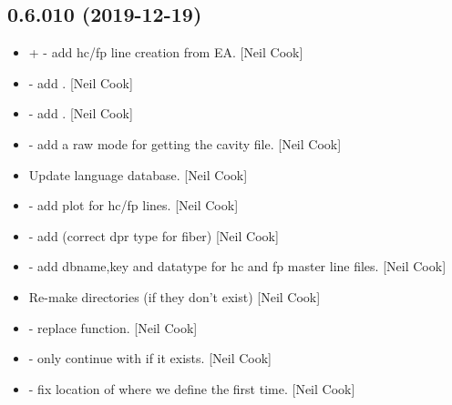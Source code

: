 \documentclass[a4paper,10pt,english]{report}
\begin{document}
\subsection{0.6.010 (2019-12-19)}
\label{\detokenize{misc/changelog:id8}}\begin{itemize}
\item {} 
 +  - add
hc/fp line creation from EA. {[}Neil Cook{]}

\item {} 
 - add .
{[}Neil Cook{]}

\item {} 
 - add . {[}Neil Cook{]}

\item {} 
 - add a raw mode for getting the cavity file. {[}Neil
Cook{]}

\item {} 
Update language database. {[}Neil Cook{]}

\item {} 
 - add plot  for hc/fp
lines. {[}Neil Cook{]}

\item {} 
 - add  (correct dpr
type for fiber) {[}Neil Cook{]}

\item {} 
 - add dbname,key and
datatype for hc and fp master line files. {[}Neil Cook{]}

\item {} 
Re-make directories (if they don’t exist) {[}Neil Cook{]}

\item {} 
 - replace  function. {[}Neil Cook{]}

\item {} 
 - only continue with  if it
exists. {[}Neil Cook{]}

\item {} 
 - fix location of where we define
 the first time. {[}Neil Cook{]}


\end{itemize}
\end{document}
